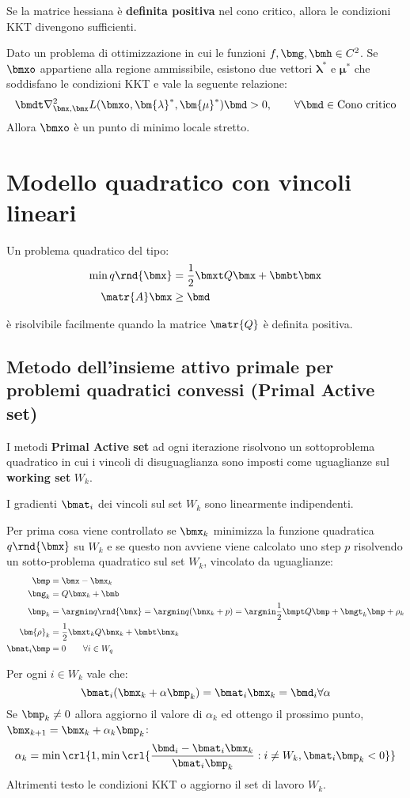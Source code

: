 \documentclass[\main/main.tex]{subfiles}
\begin{document}
Se la matrice hessiana è \textbf{definita positiva} nel cono critico, allora le condizioni KKT divengono sufficienti.

\begin{theorem}
	Dato un problema di ottimizzazione in cui le funzioni \(f, \bmg, \bmh \in C^2\). Se \(\bmxo \) appartiene alla regione ammissibile, esistono due vettori \(\bm{\lambda}^*\) e \(\bm{\mu}^*\) che soddisfano le condizioni KKT e vale la seguente relazione:
	\[
		\bmdt \nabla^2_{\bmx, \bmx} L(\bmxo, \bm{\lambda}^*, \bm{\mu}^*)\bmd > 0, \qquad \forall \bmd \in \text{Cono critico}
	\]	Allora \(\bmxo \) è un punto di minimo locale stretto.
\end{theorem}

\section{Modello quadratico con vincoli lineari}
Un problema quadratico del tipo:
\begin{align*}
	\min q\rnd{\bmx} &= \frac{1}{2} \bmxt Q \bmx + \bmbt \bmx \\
	\matr{A}\bmx &\geq \bmd
\end{align*}

è risolvibile facilmente quando la matrice \(\matr{Q}\) è definita positiva.

\subsection{Metodo dell'insieme attivo primale per problemi quadratici convessi (Primal Active set)}
I metodi \textbf{Primal Active set} ad ogni iterazione risolvono un sottoproblema quadratico in cui i vincoli di disuguaglianza sono imposti come uguaglianze sul \textbf{working set} \(W_k\).

I gradienti \(\bmat_i\) dei vincoli sul set \(W_k\) sono linearmente indipendenti.

Per prima cosa viene controllato se \(\bmx_k\) minimizza la funzione quadratica \(q\rnd{\bmx}\) su \(W_k\) e se questo non avviene viene calcolato uno step  \(p\) risolvendo un sotto-problema quadratico sul set \(W_k\), vincolato da uguaglianze:\begin{align*}
	\bmp &= \bmx - \bmx_k\\
	\bmg_k &= Q\bmx_k + \bmb \\
	\bmp_k &= \argmin q\rnd{\bmx} = \argmin q(\bmx_k + p) = \argmin \frac{1}{2}\bmpt Q \bmp + \bmgt_k \bmp + \rho_k\\
	\bm{\rho}_k &= \frac{1}{2} \bmxt_k Q \bmx_k + \bmbt \bmx_k \\
	\bmat_i \bmp &= 0 \qquad \forall i \in W_q
\end{align*}

Per ogni \(i \in W_k\) vale che:
\[
	\bmat_i(\bmx_k + \alpha\bmp_k) = \bmat_i \bmx_k = \bmd_i \forall \alpha
\]
Se \(\bmp_k \neq 0\) allora aggiorno il valore di \(\alpha_k\) ed ottengo il prossimo punto, \(\bmx_{k+1} = \bmx_k + \alpha_k\bmp_k\):
\[
	\alpha_k = \min\crl{1, \min\crl{\frac{\bmd_i - \bmat_i\bmx_k}{\bmat_i \bmp_k}: i \neq W_k, \bmat_i\bmp_k < 0}}
\]
Altrimenti testo le condizioni KKT o aggiorno il set di lavoro \(W_k\).
\end{document}

